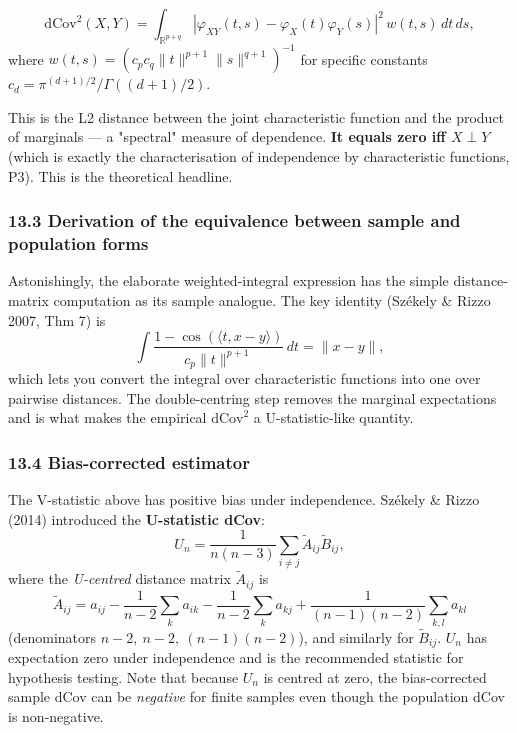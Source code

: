 \documentclass{article}
\begin{document}
\[
\mathrm{dCov}^2(X, Y) = \int_{\mathbb{R}^{p+q}} |\varphi_{XY}(t, s) - \varphi_X(t) \varphi_Y(s)|^2 \, w(t, s) \, dt \, ds,
\] where \(w(t, s) = (c_p c_q \|t\|^{p+1} \|s\|^{q+1})^{-1}\) for
specific constants \(c_d = \pi^{(d+1)/2} / \Gamma((d+1)/2)\).

This is the L2 distance between the joint characteristic function and
the product of marginals --- a "spectral" measure of dependence.
\textbf{It equals zero iff \(X \perp Y\)} (which is exactly the
characterisation of independence by characteristic functions, P3). This
is the theoretical headline.

\subsubsection{13.3 Derivation of the equivalence between sample and
population
forms}\label{133-derivation-of-the-equivalence-between-sample-and-population-forms}

Astonishingly, the elaborate weighted-integral expression has the simple
distance-matrix computation as its sample analogue. The key identity
(Székely \& Rizzo 2007, Thm 7) is \[
\int \frac{1 - \cos(\langle t, x - y \rangle)}{c_p \|t\|^{p+1}} \, dt = \|x - y\|,
\] which lets you convert the integral over characteristic functions
into one over pairwise distances. The double-centring step removes the
marginal expectations and is what makes the empirical
\(\mathrm{dCov}^2\) a U-statistic-like quantity.

\subsubsection{13.4 Bias-corrected
estimator}\label{134-bias-corrected-estimator}

The V-statistic above has positive bias under independence. Székely \&
Rizzo (2014) introduced the \textbf{U-statistic dCov}: \[
U_n = \frac{1}{n(n-3)} \sum_{i \neq j} \tilde{A}_{ij} \tilde{B}_{ij},
\] where the \emph{U-centred} distance matrix \(\tilde{A}_{ij}\) is
\[
\tilde{A}_{ij} = a_{ij} - \frac{1}{n-2}\sum_{k} a_{ik} - \frac{1}{n-2}\sum_{k} a_{kj} + \frac{1}{(n-1)(n-2)}\sum_{k,l} a_{kl}
\]
(denominators \(n-2,\ n-2,\ (n-1)(n-2)\)), and similarly for
\(\tilde{B}_{ij}\). \(U_n\) has expectation zero under independence
and is the recommended statistic for hypothesis testing. Note that
because \(U_n\) is centred at zero, the bias-corrected sample dCov
can be \emph{negative} for finite samples even though the population
dCov is non-negative.
\end{document}

